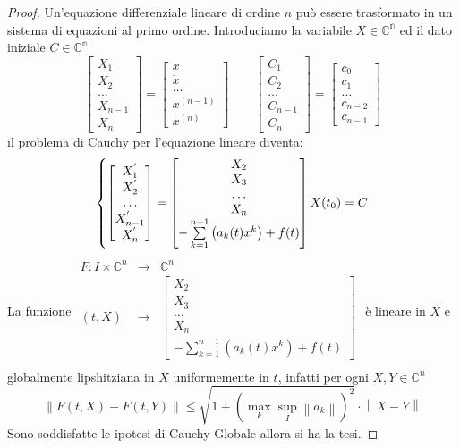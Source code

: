\begin{proof}
	Un'equazione differenziale lineare di ordine $n$ può essere trasformato in un sistema di equazioni al primo ordine.
	Introduciamo la variabile $X\in\mathbb{C^n}$ ed il dato iniziale $C\in\mathbb{C^n}$
	$$\left[\begin{matrix} X_1\\X_2\\\ldots\\X_{n-1}\\X_n \end{matrix}\right] = \left[\begin{matrix} x\\\dot{x}\\\ldots\\ x^{(n-1)}\\x^{(n)} \end{matrix}\right]\quad\quad\left[\begin{matrix} C_1\\C_2\\\ldots\\C_{n-1}\\C_{n} \end{matrix}\right] = \left[\begin{matrix} c_0\\c_1\\\ldots\\ c_{n-2}\\c_{n-1} \end{matrix}\right]$$
	il problema di Cauchy per l'equazione lineare diventa:
	$$
	\left\{
	\left[\begin{matrix} X_1^{'}\\X_2^{'}\\\ldots\\X_{n-1}^{'}\\X_n^{'} \end{matrix}\right]
	=
	\left[\begin{matrix} X_2\\X_3\\\ldots\\X_{n}\\-\sum\limits_{k=1}^{n-1}\left(a_k(t)x^k\right)+f(t) \end{matrix}\right]
	\\
	X(t_0)=C
	\right.
	$$
	La funzione
	$\begin{array}{rcl} 
	F: I\times\mathbb{C}^n & \to & \mathbb{C}^n \\
	   (t,X) & \to & \left[\begin{matrix} X_2\\X_3\\\ldots\\X_{n}\\-\sum\limits_{k=1}^{n-1}\left(a_k(t)x^k\right)+f(t) \end{matrix}\right] \\ 
	\end{array}$
	è lineare in $X$ e globalmente lipshitziana in $X$ uniformemente in $t$, infatti per ogni $X,Y\in\mathbb{C}^n$
	$$\left\|F(t,X)-F(t,Y)\right\|\le \sqrt{1+\left( \max\limits_k \sup\limits_I \left\|a_k\right\| \right)^2}\cdot\left\|X-Y\right\|$$
	Sono soddisfatte le ipotesi di Cauchy Globale allora si ha la tesi.
\end{proof}
